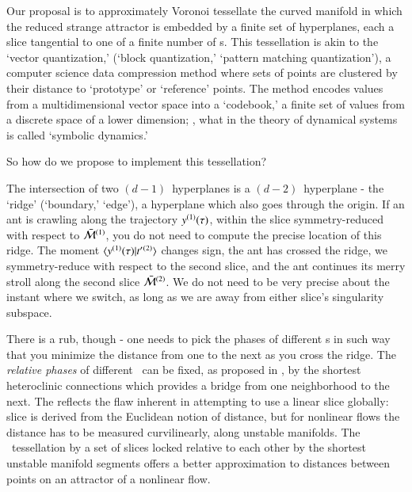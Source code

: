 Our proposal is to approximately
{Voronoi
tessellate}  the curved manifold in which the reduced strange attractor
is embedded by a finite set of hyperplanes, each a slice
tangential to one of a finite number of 
{\template s}. This tessellation is akin to the
{`vector quantization,'} (`block quantization,'  `pattern matching quantization'),
a computer science data compression method where sets of points are
clustered by their distance to `prototype' or `reference' points. The
method encodes values from a multidimensional vector space into a
`codebook,' a finite set of values from a discrete space of a lower
dimension; \ie, what in the theory of dynamical systems is called
`symbolic dynamics.'

So how do we propose to implement this tessellation?

The intersection of two $(d\!-\!1)$\dmn\ hyperplanes  is
a $(d\!-\!2)$\dmn\ hyperplane - the `ridge' (`boundary,' `edge'), a
hyperplane which also goes through the origin.
If an ant is crawling
along the trajectory $y{}^{(1)}(\tau)$, within the slice symmetry-reduced with
respect to $\bar{\cal M}{}^{(1)}$, you do not need to compute
the precise location of this ridge. The moment
$\braket{\sspRed{}^{(1)}(\tau)}{\sliceTan{}{}^{(2)}}$ changes sign, the
ant has crossed the ridge, we symmetry-reduce with respect to the second
slice, and the ant continues its merry stroll along the second slice
$\bar{\cal M}{}^{(2)}$. We do not need to be very precise about the instant
where we switch, as long as we are away from either slice's singularity
subspace.

There is a rub, though - one needs to pick the phases of
different {\template s} in such way that you minimize the distance from
one to the next as you cross the ridge. The {\em relative phases} of
different \reqva\ can be fixed, as proposed in , by the
shortest heteroclinic connections which provides a bridge from one
neighborhood to the next. The reflects the flaw inherent 
in attempting to use a linear
slice globally: slice is derived from the Euclidean notion of distance, but
for nonlinear flows the distance has to be measured curvilinearly, along
unstable manifolds. The \reducedsp\
tessellation by a set of slices locked relative to each other by the
shortest unstable manifold segments offers a better approximation to
distances between points on an attractor of a nonlinear flow.


